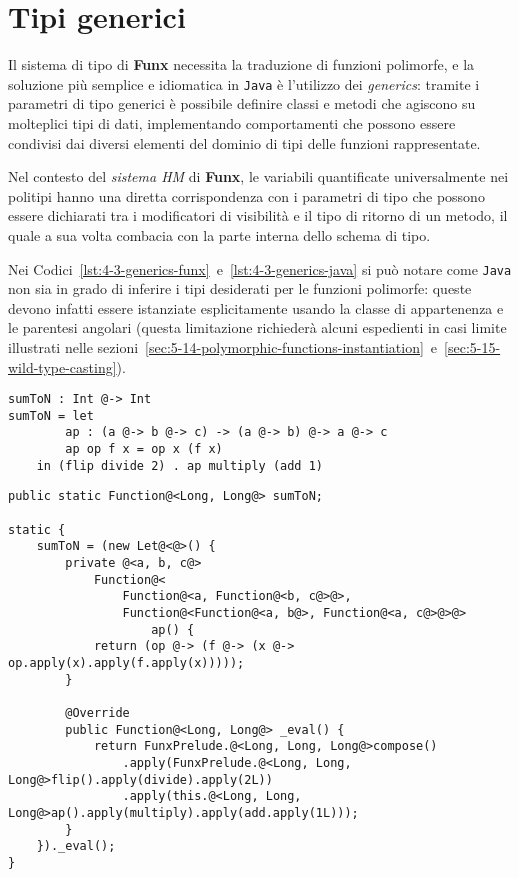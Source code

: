 \section{Tipi generici}
\label{sec:4-3-generics}

Il sistema di tipo di \textbf{Funx} necessita la traduzione di funzioni polimorfe,
e la soluzione più semplice e idiomatica in \texttt{Java} è l'utilizzo dei \textit{generics}:
tramite i parametri di tipo generici è possibile definire classi e metodi che agiscono su molteplici tipi di dati,
implementando comportamenti che possono essere condivisi dai diversi elementi del dominio di tipi delle funzioni rappresentate.


Nel contesto del \textit{sistema HM} di \textbf{Funx}, le variabili quantificate universalmente nei politipi
hanno una diretta corrispondenza con i parametri di tipo che possono essere dichiarati tra i modificatori di visibilità
e il tipo di ritorno di un metodo, il quale a sua volta combacia con la parte interna dello schema di tipo.


Nei Codici~\ref{lst:4-3-generics-funx}~e~\ref{lst:4-3-generics-java} si può notare come \texttt{Java} non sia in grado
di inferire i tipi desiderati per le funzioni polimorfe: queste devono infatti essere istanziate esplicitamente
usando la classe di appartenenza e le parentesi angolari (questa limitazione richiederà alcuni espedienti in casi limite
illustrati nelle sezioni~\ref{sec:5-14-polymorphic-functions-instantiation}~e~\ref{sec:5-15-wild-type-casting}).

\vspace{4mm}
\begin{lstlisting}[caption={Scrittura e utilizzo di funzioni polimorfe in \textbf{Funx}}, style=funxCode, label={lst:4-3-generics-funx}]
sumToN : Int @-> Int
sumToN = let
        ap : (a @-> b @-> c) -> (a @-> b) @-> a @-> c
        ap op f x = op x (f x)
    in (flip divide 2) . ap multiply (add 1)
\end{lstlisting}
\vspace{4mm}
\begin{lstlisting}[caption={Corrispondente traduzione in \texttt{Java}}, style=javaCode, label={lst:4-3-generics-java}]
public static Function@<Long, Long@> sumToN;

static {
    sumToN = (new Let@<@>() {
        private @<a, b, c@>
            Function@<
                Function@<a, Function@<b, c@>@>,
                Function@<Function@<a, b@>, Function@<a, c@>@>@>
                    ap() {
            return (op @-> (f @-> (x @-> op.apply(x).apply(f.apply(x)))));
        }

        @Override
        public Function@<Long, Long@> _eval() {
            return FunxPrelude.@<Long, Long, Long@>compose()
                .apply(FunxPrelude.@<Long, Long, Long@>flip().apply(divide).apply(2L))
                .apply(this.@<Long, Long, Long@>ap().apply(multiply).apply(add.apply(1L)));
        }
    })._eval();
}  
\end{lstlisting}
